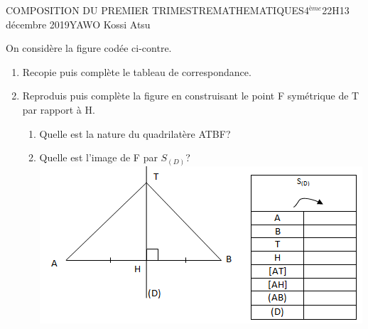 \documentclass[12pt,a4paper]{book}
\newcommand{\prof}{YAWO Kossi Atsu}
\newcommand{\matiere}{MATHEMATIQUES}
\newcommand{\classe}{4$^{ème}$}
\begin{document}
\begin{devoir}{COMPOSITION DU PREMIER TRIMESTRE}{\matiere}{\classe}{2}{2H}{13 décembre 2019}{\prof}
\begin{exo}[5]
\begin{multicols}{2}
On considère la figure codée ci-contre.
\begin{enumerate}
\item Recopie puis complète le tableau de correspondance.
\item Reproduis puis complète la figure en construisant le point F symétrique de T par rapport à H.
\begin{enumerate}
\item Quelle est la nature du quadrilatère ATBF?
\item Quelle est l'image de F par $S_{(D)}$?\\
\includegraphics[scale=0.5]{images/compo1img1.png}
\end{enumerate}
\end{enumerate}
\end{multicols}
\end{exo}

\tableofcompetences
\end{devoir}
\end{document}
